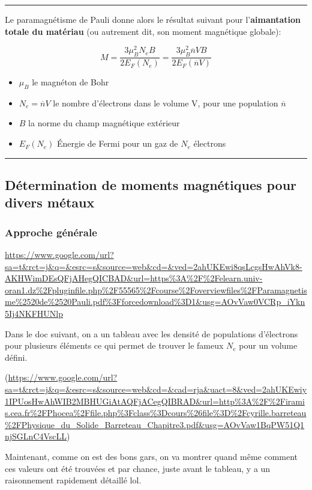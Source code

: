 \rule{\textwidth}{0.4pt}
\begin{center}
Le paramagnétisme de Pauli donne alors le résultat suivant pour l'\textbf{aimantation totale du matériau} (ou autrement dit, son moment magnétique globale):

$$M = \frac{3\mu_B^2 N_e B}{2 E_F(N_e)} = \frac{3\mu_B^2 \overline{n} V B}{2 E_F(\overline{n} V)}$$

\begin{itemize}
    \item $\mu_B$ le magnéton de Bohr
    \item $N_e = \overline{n} V$ le nombre d'électrons dans le volume V, pour une population $\overline{n}$
    \item $B$ la norme du champ magnétique extérieur
    \item $E_F(N_e)$ Énergie de Fermi pour un gaz de $N_e$ électrons
\end{itemize}    
\end{center}

\rule{\textwidth}{0.4pt}
\subsection{Détermination de moments magnétiques pour divers métaux}
\subsubsection{Approche générale}
\url{https://www.google.com/url?sa=t&rct=j&q=&esrc=s&source=web&cd=&ved=2ahUKEwi8qsLcgsHwAhVk8-AKHWimDEsQFjAHegQICBAD&url=https%3A%2F%2Felearn.univ-oran1.dz%2Fpluginfile.php%2F55565%2Fcourse%2Foverviewfiles%2FParamagnetisme%2520de%2520Pauli.pdf%3Fforcedownload%3D1&usg=AOvVaw0VCRp_iYkn5Ij4NKFHUNlp}

Dans le doc suivant, on a un tableau avec les densité de populations d'électrons pour plusieurs éléments ce qui permet de trouver le fameux $N_e$ pour un volume défini.

(\url{https://www.google.com/url?sa=t&rct=j&q=&esrc=s&source=web&cd=&cad=rja&uact=8&ved=2ahUKEwiy1IPUosHwAhWIB2MBHUGiAtAQFjACegQIBRAD&url=http%3A%2F%2Firamis.cea.fr%2FPhocea%2Ffile.php%3Fclass%3Dcours%26file%3D%2Fcyrille.barreteau%2FPhysique_du_Solide_Barreteau_Chapitre3.pdf&usg=AOvVaw1BqPW51Q1njSGLnC4VscLL})

Maintenant, comme on est des bons gars, on va montrer quand même comment ces valeurs ont été trouvées et par chance, juste avant le tableau, y a un raisonnement rapidement détaillé lol.

